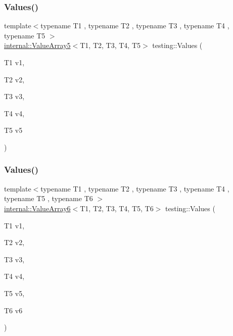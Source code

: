 \subsubsection{\texorpdfstring{Values()}{Values()}\hspace{0.1cm}{\footnotesize\ttfamily [5/50]}}
{\footnotesize\ttfamily template$<$typename T1 , typename T2 , typename T3 , typename T4 , typename T5 $>$ \\
\mbox{\hyperlink{classtesting_1_1internal_1_1ValueArray5}{internal\+::\+Value\+Array5}}$<$T1, T2, T3, T4, T5$>$ testing\+::\+Values (\begin{DoxyParamCaption}\item[{T1}]{v1,  }\item[{T2}]{v2,  }\item[{T3}]{v3,  }\item[{T4}]{v4,  }\item[{T5}]{v5 }\end{DoxyParamCaption})}

\mbox{\label{namespacetesting_a552772c4c4daa68b5e995e0d64651150}} 
\subsubsection{\texorpdfstring{Values()}{Values()}\hspace{0.1cm}{\footnotesize\ttfamily [6/50]}}
{\footnotesize\ttfamily template$<$typename T1 , typename T2 , typename T3 , typename T4 , typename T5 , typename T6 $>$ \\
\mbox{\hyperlink{classtesting_1_1internal_1_1ValueArray6}{internal\+::\+Value\+Array6}}$<$T1, T2, T3, T4, T5, T6$>$ testing\+::\+Values (\begin{DoxyParamCaption}\item[{T1}]{v1,  }\item[{T2}]{v2,  }\item[{T3}]{v3,  }\item[{T4}]{v4,  }\item[{T5}]{v5,  }\item[{T6}]{v6 }\end{DoxyParamCaption})}

\mbox{\label{namespacetesting_a8fe9ae088304ebc64de1b076951e6eb8}} 
